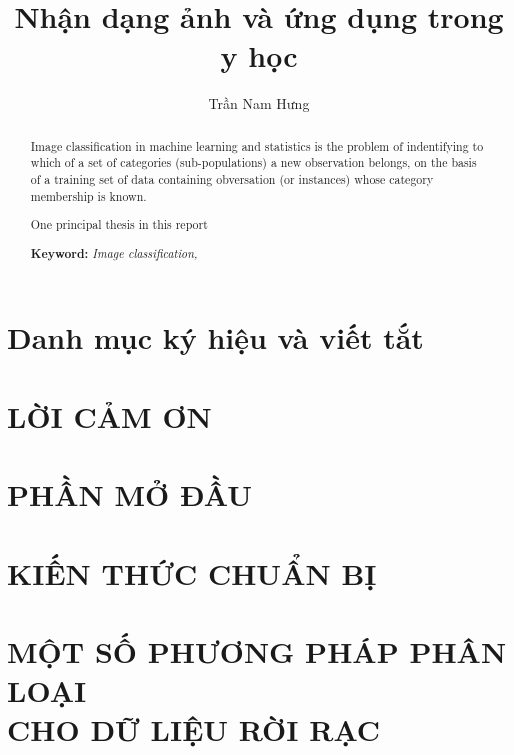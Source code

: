 \documentclass[a4paper,oneside]{report}			%
\title{Nhận dạng ảnh và ứng dụng trong y học}
\author{Trần Nam Hưng}
\theoremstyle{plain}
\theoremstyle{plain}
\theoremstyle{nonumberplain}
\begin{document}



\begin{abstract}
	Image classification in machine learning and statistics is the problem of indentifying to which of a set of categories (sub-populations) a new observation belongs, on the basis of a training set of data containing obversation (or instances) whose category membership is known.
	
	One principal thesis in this report 

	\textbf{Keyword:} \textit{Image classification,}
\end{abstract}


\tableofcontents			%
\listoffigures				%
\listoftables				%
\listofalgorithms

\chapter*{Danh mục ký hiệu và viết tắt}

\clearpage

\chapter*{LỜI CẢM ƠN}


\chapter*{PHẦN MỞ ĐẦU}

	
\chapter{KIẾN THỨC CHUẨN BỊ}
\setcounter{page}{1}	%
	

\chapter[MỘT SỐ PHƯƠNG PHÁP PHÂN LOẠI CHO DỮ LIỆU RỜI RẠC]{MỘT SỐ PHƯƠNG PHÁP PHÂN LOẠI\\ CHO DỮ LIỆU RỜI RẠC}
	
\end{document}

